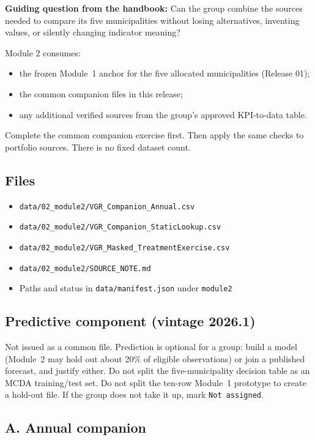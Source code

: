 \documentclass[11pt,a4paper]{article}
\begin{document}
\textbf{Guiding question from the handbook:}
Can the group combine the sources needed to compare its five
municipalities without losing alternatives, inventing values, or
silently changing indicator meaning?

Module 2 consumes:
\begin{itemize}
    \item the frozen Module~1 anchor for the five allocated
    municipalities (Release 01);
    \item the common companion files in this release;
    \item any additional verified sources from the group's approved
    KPI-to-data table.
\end{itemize}

Complete the common companion exercise first. Then apply the same
checks to portfolio sources. There is no fixed dataset count.

\subsection*{Files}

\begin{itemize}
    \item \texttt{data/02\_module2/VGR\_Companion\_Annual.csv}
    \item \texttt{data/02\_module2/VGR\_Companion\_StaticLookup.csv}
    \item \texttt{data/02\_module2/VGR\_Masked\_TreatmentExercise.csv}
    \item \texttt{data/02\_module2/SOURCE\_NOTE.md}
    \item Paths and status in \texttt{data/manifest.json} under
    \texttt{module2}
\end{itemize}

\subsection*{Predictive component (vintage 2026.1)}

Not issued as a common file. Prediction is optional for a group:
build a model (Module~2 may hold out about 20\% of eligible
observations) or join a published forecast, and justify either.
Do not split the five-municipality decision table as an MCDA
training/test set. Do not split the ten-row Module~1 prototype
to create a hold-out file. If the group does not take it up,
mark \texttt{Not assigned}.

\subsection*{A. Annual companion}
\end{document}
